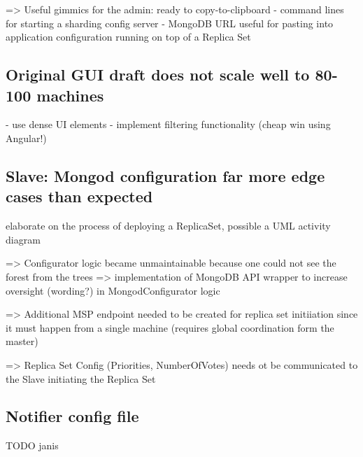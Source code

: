 => Useful gimmics for the admin: ready to copy-to-clipboard 
    - command lines for starting a sharding config server
    - MongoDB URL useful for pasting into application configuration running on top of a Replica Set

\subsection{Original GUI draft does not scale well to 80-100 machines }

- use dense UI elements
- implement filtering functionality (cheap win using Angular!)

\subsection{Slave: Mongod configuration far more edge cases than expected}

elaborate on the process of deploying a ReplicaSet, possible a UML activity diagram

=> Configurator logic became unmaintainable because one could not see the forest from the trees
  => implementation of MongoDB API wrapper to increase oversight (wording?) in MongodConfigurator logic

=> Additional MSP endpoint needed to be created for replica set initiiation since it must happen from a single machine
   (requires global coordination form the master)

  => Replica Set Config (Priorities, NumberOfVotes) needs ot be communicated to the Slave initiating the Replica Set

\subsection{Notifier config file}

TODO janis
